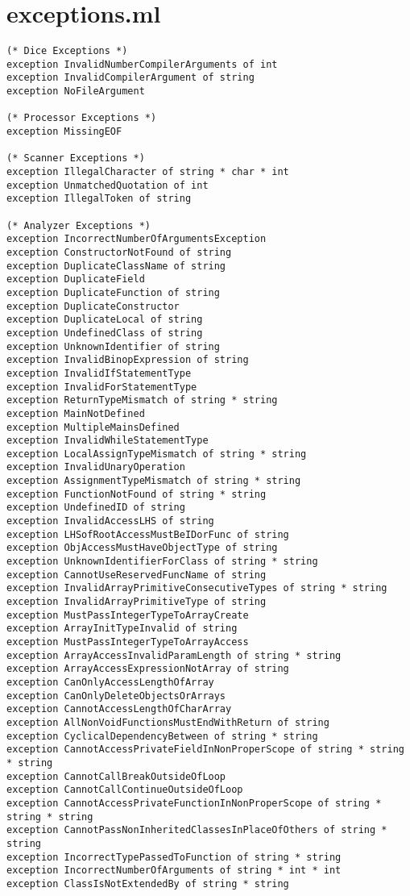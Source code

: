 \section{exceptions.ml}
\begin{verbatim}
(* Dice Exceptions *)
exception InvalidNumberCompilerArguments of int
exception InvalidCompilerArgument of string
exception NoFileArgument

(* Processor Exceptions *)
exception MissingEOF

(* Scanner Exceptions *)
exception IllegalCharacter of string * char * int
exception UnmatchedQuotation of int
exception IllegalToken of string

(* Analyzer Exceptions *)
exception IncorrectNumberOfArgumentsException
exception ConstructorNotFound of string
exception DuplicateClassName of string
exception DuplicateField
exception DuplicateFunction of string
exception DuplicateConstructor
exception DuplicateLocal of string
exception UndefinedClass of string
exception UnknownIdentifier of string
exception InvalidBinopExpression of string
exception InvalidIfStatementType
exception InvalidForStatementType
exception ReturnTypeMismatch of string * string
exception MainNotDefined
exception MultipleMainsDefined
exception InvalidWhileStatementType
exception LocalAssignTypeMismatch of string * string
exception InvalidUnaryOperation
exception AssignmentTypeMismatch of string * string
exception FunctionNotFound of string * string
exception UndefinedID of string
exception InvalidAccessLHS of string
exception LHSofRootAccessMustBeIDorFunc of string
exception ObjAccessMustHaveObjectType of string
exception UnknownIdentifierForClass of string * string
exception CannotUseReservedFuncName of string
exception InvalidArrayPrimitiveConsecutiveTypes of string * string
exception InvalidArrayPrimitiveType of string
exception MustPassIntegerTypeToArrayCreate
exception ArrayInitTypeInvalid of string
exception MustPassIntegerTypeToArrayAccess
exception ArrayAccessInvalidParamLength of string * string
exception ArrayAccessExpressionNotArray of string
exception CanOnlyAccessLengthOfArray
exception CanOnlyDeleteObjectsOrArrays
exception CannotAccessLengthOfCharArray
exception AllNonVoidFunctionsMustEndWithReturn of string
exception CyclicalDependencyBetween of string * string
exception CannotAccessPrivateFieldInNonProperScope of string * string * string
exception CannotCallBreakOutsideOfLoop
exception CannotCallContinueOutsideOfLoop
exception CannotAccessPrivateFunctionInNonProperScope of string * string * string
exception CannotPassNonInheritedClassesInPlaceOfOthers of string * string
exception IncorrectTypePassedToFunction of string * string
exception IncorrectNumberOfArguments of string * int * int
exception ClassIsNotExtendedBy of string * string


\end{verbatim}
